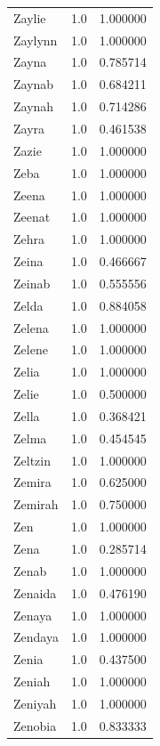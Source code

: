 \documentclass[
  letterpaper,
  DIV=11,
  numbers=noendperiod]{scrreprt}
\begin{document}
\begin{tabular}{lrr}
Zaylie          &   1.0 &   1.000000 \\
Zaylynn         &   1.0 &   1.000000 \\
Zayna           &   1.0 &   0.785714 \\
Zaynab          &   1.0 &   0.684211 \\
Zaynah          &   1.0 &   0.714286 \\
Zayra           &   1.0 &   0.461538 \\
Zazie           &   1.0 &   1.000000 \\
Zeba            &   1.0 &   1.000000 \\
Zeena           &   1.0 &   1.000000 \\
Zeenat          &   1.0 &   1.000000 \\
Zehra           &   1.0 &   1.000000 \\
Zeina           &   1.0 &   0.466667 \\
Zeinab          &   1.0 &   0.555556 \\
Zelda           &   1.0 &   0.884058 \\
Zelena          &   1.0 &   1.000000 \\
Zelene          &   1.0 &   1.000000 \\
Zelia           &   1.0 &   1.000000 \\
Zelie           &   1.0 &   0.500000 \\
Zella           &   1.0 &   0.368421 \\
Zelma           &   1.0 &   0.454545 \\
Zeltzin         &   1.0 &   1.000000 \\
Zemira          &   1.0 &   0.625000 \\
Zemirah         &   1.0 &   0.750000 \\
Zen             &   1.0 &   1.000000 \\
Zena            &   1.0 &   0.285714 \\
Zenab           &   1.0 &   1.000000 \\
Zenaida         &   1.0 &   0.476190 \\
Zenaya          &   1.0 &   1.000000 \\
Zendaya         &   1.0 &   1.000000 \\
Zenia           &   1.0 &   0.437500 \\
Zeniah          &   1.0 &   1.000000 \\
Zeniyah         &   1.0 &   1.000000 \\
Zenobia         &   1.0 &   0.833333 \\

\end{tabular}
\end{document}
